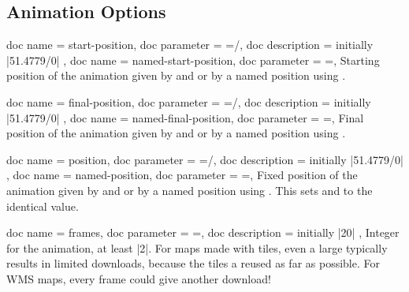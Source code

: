 \clearpage
\subsection{Animation Options}\label{ref:animOptions}

\begin{docMrcKeys}[
    doc keypath = anim,
    doc new     = 2024-07-31,
  ]{
    {
      doc name        = start-position,
      doc parameter   = {=/},
      doc description = initially |51.4779/0|
    },
    {
      doc name      = named-start-position,
      doc parameter = {=},
    }
  }
  Starting position of the animation given by
   and  or by a named position using .
\end{docMrcKeys}


\begin{docMrcKeys}[
    doc keypath = anim,
    doc new     = 2024-07-31,
  ]{
    {
      doc name        = final-position,
      doc parameter   = {=/},
      doc description = initially |51.4779/0|
    },
    {
      doc name      = named-final-position,
      doc parameter = {=},
    }
  }
  Final position of the animation given by
   and  or by a named position using .
\end{docMrcKeys}


\begin{docMrcKeys}[
    doc keypath = anim,
    doc new     = 2024-07-31,
  ]{
    {
      doc name        = position,
      doc parameter   = {=/},
      doc description = initially |51.4779/0|
    },
    {
      doc name      = named-position,
      doc parameter = {=},
    }
  }
  Fixed position of the animation given by
   and  or by a named position using .
  This sets  and
   to the identical value.
\end{docMrcKeys}



\begin{docMrcKeys}[
    doc keypath = anim,
    doc new     = 2024-07-31,
  ]{
    {
      doc name        = frames,
      doc parameter   = {=},
      doc description = initially |20|
    },
  }
  Integer  for the animation, at least |2|. For maps made with tiles,
  even a large  typically results in limited downloads,
  because the tiles a reused as far as possible. For WMS maps, every frame
  could give another download!
\end{docMrcKeys}


